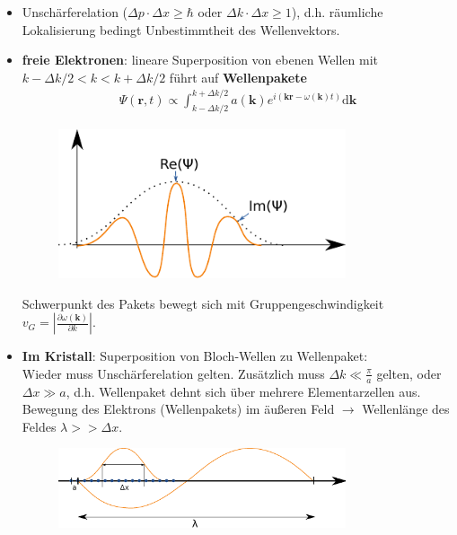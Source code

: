 \begin{itemize}
    \item Unschärferelation ($\Delta p \cdot \Delta x \ge \hbar$ oder $\Delta k \cdot \Delta x \ge 1$), d.h. räumliche Lokalisierung bedingt Unbestimmtheit des Wellenvektors.
    \item \textbf{freie Elektronen}: lineare Superposition von ebenen Wellen mit $k - \Delta k / 2 < k < k + \Delta k / 2$ führt auf \textbf{Wellenpakete}
          \begin{align}
              \Psi(\textbf{r},t) \propto \int_{k-\Delta k/2}^{k+\Delta k/2} a(\textbf{k}) e^{i(\textbf{k}\textbf{r} - \omega(\textbf{k})t)} \mathrm{d}\textbf{k}
          \end{align}

          \begin{figure}[H]
              \centering
              \includegraphics[width=0.8\textwidth]{figures/6_1Welle.pdf}
              \caption{}
              \label{fig:6_1Welle}
          \end{figure}

          Schwerpunkt des Pakets bewegt sich mit Gruppengeschwindigkeit $v_G = \left|\frac{\partial\omega(\textbf{k})}{\partial k}\right|$.
    \item \textbf{Im Kristall}: Superposition von Bloch-Wellen zu Wellenpaket: \\
          Wieder muss Unschärferelation gelten. Zusätzlich muss $\Delta k \ll \frac{\pi}{a}$ gelten, oder $\Delta x \gg a$, d.h. Wellenpaket dehnt sich über mehrere Elementarzellen aus. Bewegung des Elektrons (Wellenpakets) im äußeren Feld $\rightarrow$ Wellenlänge des Feldes $\lambda >> \Delta x$.

          \begin{figure}[H]
              \centering
              \includegraphics[width=0.8\textwidth]{figures/6_2BewEl.pdf}
              \caption{}
              \label{fig:6_1BewEl}
          \end{figure}


\end{itemize}
